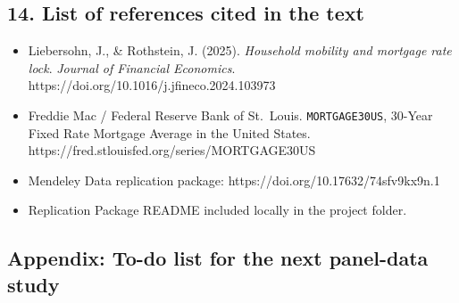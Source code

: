 \documentclass[a4paper,11pt]{article}
\renewcommand{\_}{\textunderscore\allowbreak}
\providecommand{\tightlist}{%
  \setlength{\itemsep}{0pt}\setlength{\parskip}{0pt}}
\begin{document}
\hypertarget{list-of-references-cited-in-the-text}{%
\subsection{14. List of references cited in the
text}\label{list-of-references-cited-in-the-text}}

\begin{itemize}
\tightlist
\item
  Liebersohn, J., \& Rothstein, J. (2025). \emph{Household mobility and
  mortgage rate lock}. \emph{Journal of Financial Economics}.
  https://doi.org/10.1016/j.jfineco.2024.103973
\item
  Freddie Mac / Federal Reserve Bank of St.~Louis.
  \texttt{MORTGAGE30US}, 30-Year Fixed Rate Mortgage Average in the
  United States. https://fred.stlouisfed.org/series/MORTGAGE30US
\item
  Mendeley Data replication package:
  https://doi.org/10.17632/74sfv9kx9n.1
\item
  Replication Package README included locally in the project folder.
\end{itemize}

\hypertarget{appendix-to-do-list-for-the-next-panel-data-study}{%
\subsection{Appendix: To-do list for the next panel-data
study}\label{appendix-to-do-list-for-the-next-panel-data-study}}
\end{document}
